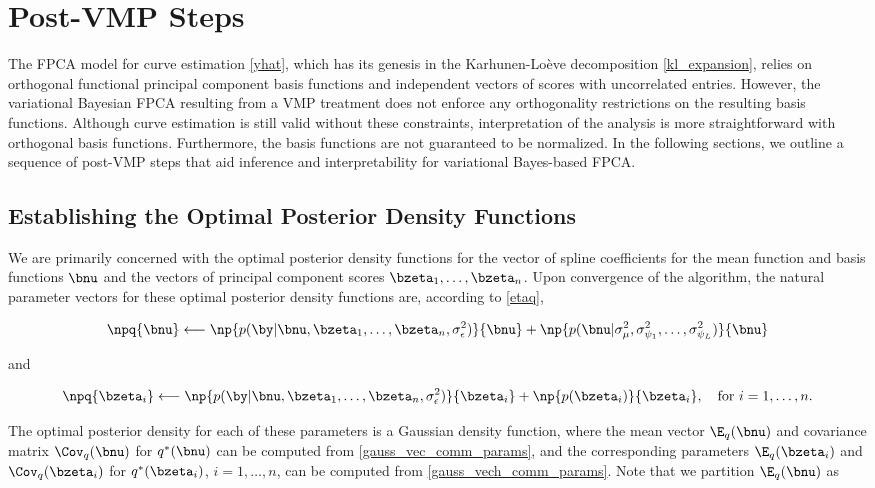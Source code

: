 \documentclass[12pt]{article}
\def\sigsqeps{\sigma^2_{\epsilon}}
\def\sigsqmu{\sigma^2_{\mu}}
\newcommand\sigsqpsi[1]{\sigma^2_{\psi_{#1}}}
\theoremstyle{plain}
\theoremstyle{definition}
\theoremstyle{remark}
\begin{document}
\section{Post-VMP Steps}
\label{sec:post_vmp_steps}

The FPCA model for curve estimation \eqref{yhat}, which has its genesis in the Karhunen-Lo\`{e}ve decomposition
\eqref{kl_expansion}, relies on orthogonal functional principal component
basis functions and independent vectors of scores with uncorrelated entries.
However, the variational Bayesian FPCA resulting from a VMP treatment
does not enforce any orthogonality restrictions on the resulting basis functions. Although curve estimation is still
valid without these constraints, interpretation of the analysis is more straightforward with orthogonal basis
functions. Furthermore, the basis functions are not guaranteed to be normalized.
In the following sections, we outline
a sequence of post-VMP steps that aid inference and interpretability for variational Bayes-based FPCA.


\subsection{Establishing the Optimal Posterior Density Functions}
\label{sec:opt_dens_funcs}

We are primarily concerned with the optimal posterior density functions for the vector of spline coefficients for
the mean function and basis functions $\bnu$ and the vectors of principal component scores $\bzeta_1, \dots,
\bzeta_n$. Upon convergence of the algorithm, the natural parameter vectors for these optimal posterior density
functions are, according to \eqref{etaq},

\[
	\npq{\bnu} \longleftarrow
		\np{p (\by | \bnu, \bzeta_1, \dots, \bzeta_n, \sigsqeps)}{\bnu}
		+ \np{p (\bnu | \sigsqmu, \sigsqpsi{1}, \dots, \sigsqpsi{L})}{\bnu}
\]

\noindent and

\[
	\npq{\bzeta_i} \longleftarrow
		\np{p (\by | \bnu, \bzeta_1, \dots, \bzeta_n, \sigsqeps)}{\bzeta_i}
		+ \np{p (\bzeta_i)}{\bzeta_i}, \quad
	\text{for $i = 1, \dots, n$.}
\]

\noindent The optimal posterior density for each of these parameters is a Gaussian density
function, where the mean vector $\E_q (\bnu)$ and covariance matrix $\Cov_q (\bnu)$ for $q^* (\bnu)$
can be computed from
\eqref{gauss_vec_comm_params}, and the corresponding parameters $\E_q (\bzeta_i)$ and $\Cov_q (\bzeta_i)$
for $q^* (\bzeta_i)$, $i = 1, \dots, n$, can be
computed from \eqref{gauss_vech_comm_params}. Note that we partition $\E_q (\bnu)$ as
\end{document}
